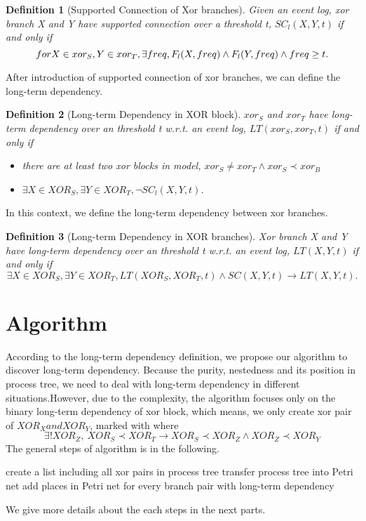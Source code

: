 \documentclass[]{article}
\newtheorem{mydef}{Definition}[section]
\begin{document}
\begin{mydef}[Supported Connection of Xor branches]
Given an event log, xor branch X and Y have supported connection over a threshold t, $SC_{l}(X,Y,t)$ if and only if \[ for \space X \in xor_S, Y \in xor_T, \exists freq, F_{l}(X,freq) \land F_{l}(Y,freq) \land freq \geq t.\]
\end{mydef}
After introduction of supported connection of xor branches, we can define the long-term dependency. 
\begin{mydef}[Long-term Dependency in XOR block]
	$xor_S$ and $xor_T$ have long-term dependency over an threshold t w.r.t. an event log, $LT(xor_S, xor_T,t) $ if and only if 
	\begin{itemize}
		\item there are at least two xor blocks in model, $xor_S \neq xor_T \land xor_S \prec xor_B$
		\item $\exists X \in XOR_S, \exists Y \in XOR_T, \lnot SC_{l}(X,Y,t)$. 
	\end{itemize}
\end{mydef}
In this context, we define the long-term dependency between xor branches.
\begin{mydef}[Long-term Dependency in XOR branches]
	Xor branch X and Y have long-term dependency over an threshold t w.r.t. an event log, $LT(X,Y,t) $ if and only if  
	\[\exists X \in XOR_S, \exists Y \in XOR_T, LT(XOR_S, XOR_T, t) \land SC(X,Y,t) \rightarrow LT(X,Y,t).\]	
\end{mydef}

\section{Algorithm}
According to the long-term dependency definition, we propose our algorithm to discover long-term dependency. Because the purity, nestedness and its position in process tree, we need to deal with long-term dependency in different situations.However, due to the complexity, the algorithm focuses only on the binary long-term dependency of xor block, which means, we only create xor pair of $XOR_X and XOR_Y$, marked with where 
\[ \exists ! XOR_Z, \: XOR_S \prec XOR_T \rightarrow XOR_S \prec XOR_Z \land XOR_Z \prec XOR_Y \]
The general steps of algorithm is in the following. 

\begin{algorithm}[H]
	\SetAlgoLined
	create a list including all xor pairs in process tree\;
	transfer process tree into Petri net\;
	add places in Petri net for every branch pair with long-term dependency\;
	\caption{General steps to add long-term dependency}
\end{algorithm}
We give more details about the each steps in the next parts.
\end{document}
